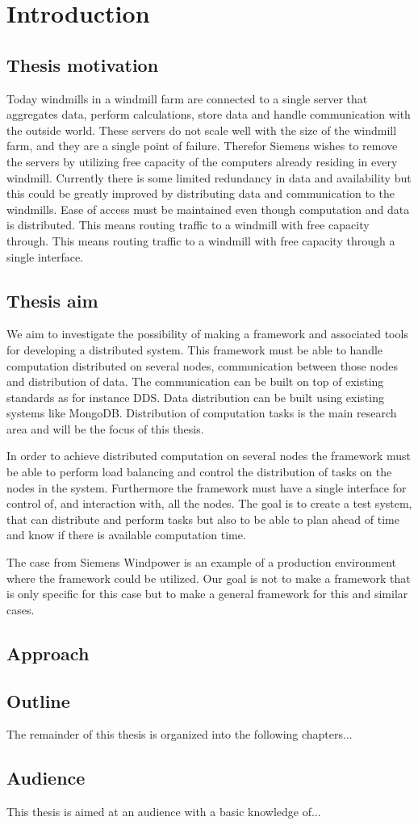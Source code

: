 \chapter{Introduction}

\section{Thesis motivation}
Today windmills in a windmill farm are connected to a single server that aggregates data, perform calculations, store data and handle communication with the outside world. 
These servers do not scale well with the size of the windmill farm, and they are a single point of failure. 
Therefor Siemens wishes to remove the servers by utilizing free capacity of the computers already residing in every windmill. 
Currently there is some limited redundancy in data and availability but this could be greatly improved by distributing data and communication to the windmills. 
Ease of access must be maintained even though computation and data is distributed. 
This means routing traffic to a windmill with free capacity through. 
This means routing traffic to a windmill with free capacity through  a single interface.

\section{Thesis aim}
We aim to investigate the possibility of making a framework and associated tools for developing a distributed system. 
This framework must be able to handle computation distributed on several nodes, communication between those nodes and distribution of data. 
The communication can be built on top of existing standards as for instance DDS. Data distribution can be built using existing systems like MongoDB. 
Distribution of computation tasks is the main research area and will be the focus of this thesis.

In order to achieve distributed computation on several nodes the framework must be able to perform load balancing and control the distribution of tasks on the nodes in the system. 
Furthermore the framework must have a single interface for control of, and interaction with, all the nodes.  
The goal is to create a test system, that can distribute and perform tasks but also to be able to plan ahead of time and know if there is available computation time.

The case from Siemens Windpower is an example of a production environment where the framework could be utilized. 
Our goal is not to make a framework that is only  specific for this case but to make a general framework for this and similar cases.

\section{Approach}

\section{Outline}
The remainder of this thesis is organized into the following chapters...

\section{Audience}
This thesis is aimed at an audience with a basic knowledge of...
